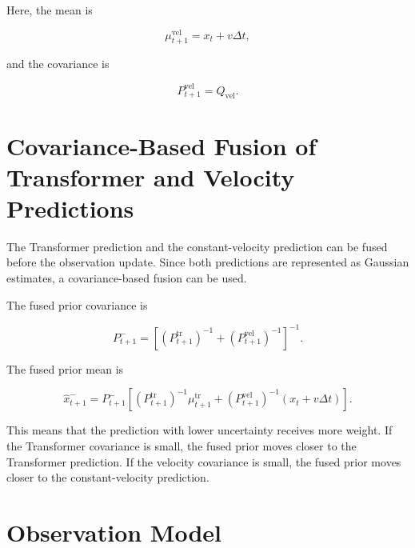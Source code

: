 \documentclass[a4paper]{article}
\begin{document}
        Here, the mean is
        
        \[
            \mu_{t+1}^{\mathrm{vel}}
            =
            x_t
            +
            v\Delta t,
        \]
        
        and the covariance is
        
        \[
            P_{t+1}^{\mathrm{vel}}
            =
            Q_{\mathrm{vel}}.
        \]
    
    
    \section{Covariance-Based Fusion of Transformer and Velocity Predictions}
        
        The Transformer prediction and the constant-velocity prediction can be fused before the observation update. Since both predictions are represented as Gaussian estimates, a covariance-based fusion can be used.
        
        The fused prior covariance is
        
        \[
            P_{t+1}^{-}
            =
            \left[
                \left(
                    P_{t+1}^{\mathrm{tr}}
                \right)^{-1}
                +
                \left(
                    P_{t+1}^{\mathrm{vel}}
                \right)^{-1}
            \right]^{-1}.
        \]
        
        The fused prior mean is
        
        \[
            \hat{x}_{t+1}^{-}
            =
            P_{t+1}^{-}
            \left[
                \left(
                    P_{t+1}^{\mathrm{tr}}
                \right)^{-1}
                \mu_{t+1}^{\mathrm{tr}}
                +
                \left(
                    P_{t+1}^{\mathrm{vel}}
                \right)^{-1}
                \left(
                    x_t
                    +
                    v\Delta t
                \right)
            \right].
        \]
        
        This means that the prediction with lower uncertainty receives more weight. If the Transformer covariance is small, the fused prior moves closer to the Transformer prediction. If the velocity covariance is small, the fused prior moves closer to the constant-velocity prediction.
    
    
    \section{Observation Model}
        
\end{document}

